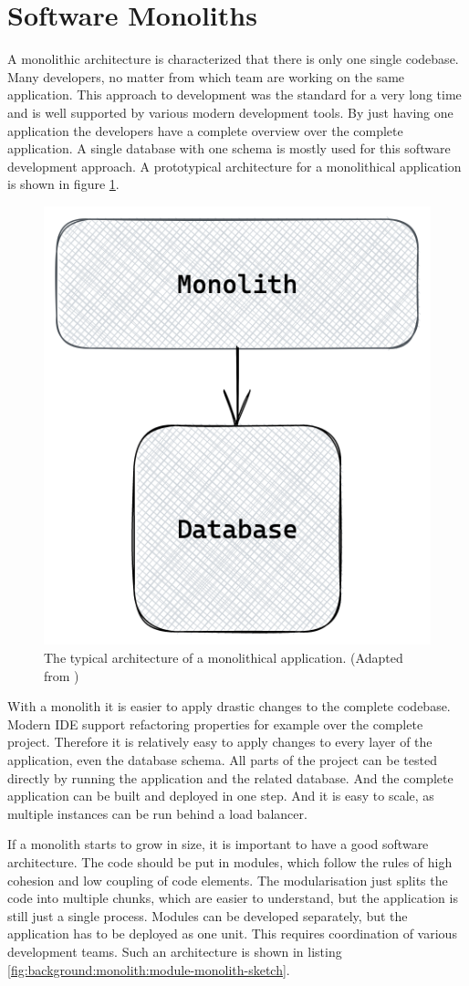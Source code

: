 \section{Software Monoliths}

A monolithic architecture is characterized that there is only one single codebase. Many developers, no matter from which team are working on the same application. This approach to development was the standard for a very long time and is well supported by various modern development tools. By just having one application the developers have a complete overview over the complete application. A single database with one schema is mostly used for this software development approach. A prototypical architecture for a monolithical application is shown in figure \ref{fig:background:monolith:monolith-sketch}.

\ifshowImages
\begin{figure}[H]
    \centering
    \includegraphics[width=0.3\linewidth]{images/background/monolith/monolith-sketch.png}
    \caption{The typical architecture of a monolithical application. (Adapted from \cite[12]{book:2019:newman:background:monolith:monolith-to-microservices})}\label{fig:background:monolith:monolith-sketch}
\end{figure}
\fi

\bigskip

\noindent With a monolith it is easier to apply drastic changes to the complete codebase. Modern IDE support refactoring properties for example over the complete project. Therefore it is relatively easy to apply changes to every layer of the application, even the database schema. All parts of the project can be tested directly by running the application and the related database. And the complete application can be built and deployed in one step. And it is easy to scale, as multiple instances can be run behind a load balancer. \cite[4]{book:2018:richardson:background:bff:microservices-patterns}

\bigskip

\noindent If a monolith starts to grow in size, it is important to have a good software architecture. The code should be put in modules, which follow the rules of high cohesion and low coupling of code elements. The modularisation just splits the code into multiple chunks, which are easier to understand, but the application is still just a single process. Modules can be developed separately, but the application has to be deployed as one unit. This requires coordination of various development teams. \cite[12-13]{book:2018:richardson:background:bff:microservices-patterns} \cite[12-13]{book:2019:newman:background:monolith:monolith-to-microservices} Such an architecture is shown in listing \ref{fig:background:monolith:module-monolith-sketch}.


